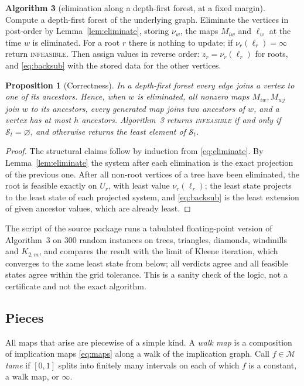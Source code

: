 \documentclass[11pt,a4paper]{article}
\theoremstyle{plain}
\newtheorem{proposition}[theorem]{Proposition}
\theoremstyle{definition}
\theoremstyle{remark}
\newcommand{\St}{\mathcal{S}_t}
\newcommand{\M}{\mathcal{M}}
\newcommand{\INF}{\textnormal{\textsc{infeasible}}}
\begin{document}
\medskip
\noindent\textbf{Algorithm 3} (elimination along a depth-first forest, at a fixed margin). Compute a depth-first forest of the underlying graph. Eliminate the vertices in post-order by Lemma~\ref{lem:eliminate}, storing $\nu_w$, the maps $M_{iw}$ and $\ell_w$ at the time $w$ is eliminated. For a root $r$ there is nothing to update; if $\nu_r(\ell_r)=\infty$ return \INF. Then assign values in reverse order: $z_r=\nu_r(\ell_r)$ for roots, and \eqref{eq:backsub} with the stored data for the other vertices.

\begin{proposition}[Correctness]\label{prop:elimcorrect}
In a depth-first forest every edge joins a vertex to one of its ancestors. Hence, when $w$ is eliminated, all nonzero maps $M_{iw},M_{wj}$ join $w$ to its ancestors, every generated map joins two ancestors of $w$, and a vertex has at most $h$ ancestors. Algorithm~3 returns \INF{} if and only if $\St=\varnothing$, and otherwise returns the least element of $\St$.
\end{proposition}
\begin{proof}
The structural claims follow by induction from \eqref{eq:eliminate}. By Lemma~\ref{lem:eliminate} the system after each elimination is the exact projection of the previous one. After all non-root vertices of a tree have been eliminated, the root is feasible exactly on $U_r$, with least value $\nu_r(\ell_r)$; the least state projects to the least state of each projected system, and \eqref{eq:backsub} is the least extension of given ancestor values, which are already least.
\end{proof}

The script  of the source package runs a tabulated floating-point version of Algorithm~3 on $300$ random instances on trees, triangles, diamonds, windmills and $K_{2,m}$, and compares the result with the limit of Kleene iteration, which converges to the same least state from below; all verdicts agree and all feasible states agree within the grid tolerance. This is a sanity check of the logic, not a certificate and not the exact algorithm.

\subsection{Pieces}
All maps that arise are piecewise of a simple kind. A \emph{walk map} is a composition of implication maps \eqref{eq:maps} along a walk of the implication graph. Call $f\in\M$ \emph{tame} if $[0,1]$ splits into finitely many intervals on each of which $f$ is a constant, a walk map, or $\infty$.
\end{document}
